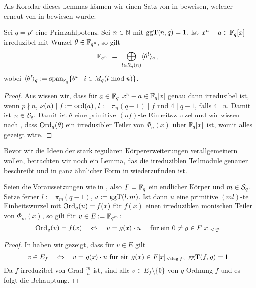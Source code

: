Als Korollar dieses Lemmas können wir einen Satz von \citeauthor{semaev:1989}
\citeyear{semaev:1989} in 
\autocite{semaev:1989} beweisen, welcher erneut von \citeauthor{gao:1997}
\citeyear{gao:1997} in \autocite{gao:1997} bewiesen wurde:

\begin{satz}
  \label{satz:gao1}
  Sei $q = p^r$ eine Primzahlpotenz. Sei $n \in \N$ mit $\ggT(n,q)=1$.
  Ist $x^n - a \in \F_q[x]$ irreduzibel mit Wurzel $\theta\in \F_{q^n}$, so
  gilt 
  \[ \F_{q^n} \speq= \bigoplus_{l\in R_q(n)} \langle \theta^l\rangle_q\,,\]
  wobei $\langle \theta^l\rangle_q := 
  \spann_{\F_q}\{ \theta^i \mid i\in M_q(l\bmod n)\}$.
\end{satz}
\begin{proof}
  Aus \thref{}  wissen wir, dass für $a \in \F_q$
  $x^n-a \in \F_q[x]$ genau dann irreduzibel ist, wenn
  $p\nmid n$, $\nu(n) \mid f := \ord(a)$, $l := \pi_n(q-1)\mid f$ und
  $4 \mid q-1$, falls $4\mid n$. Damit ist $n \in \S_q$.
  Damit ist $\theta$ eine primitive $(nf)$-te Einheitswurzel und wir wissen
  nach , dass
  $\Ord_q(\theta)$ ein irreduzibler Teiler von $\Phi_n(x)$ über $\F_q[x]$ ist,
  womit alles gezeigt wäre.
\end{proof}

Bevor wir die Ideen der stark regulären Körpererweiterungen verallgemeinern
wollen, betrachten wir noch ein Lemma, das die irreduziblen Teilmodule genauer
beschreibt und in ganz ähnlicher Form in \autocite[Theorem
22.5]{hachenberger1997finite} wiederzufinden ist.

\begin{lemma}
  \label{lemma:erzeuger_von_irred_teilmoduln}
  Seien die Voraussetzungen wie in , also
  $F = \F_q$ ein endlicher Körper und $m\in \S_q$. Setze ferner 
  $l := \pi_m(q-1)$, $a := \ggT(l,m)$. Ist dann $u$ eine primitive 
  $(ml)$-te Einheitswurzel mit $\Ord_q(u) = f(x)$ für $f(x)$ einen irreduziblen
  monischen Teiler von $\Phi_m(x)$, so gilt für $v \in E:= \F_{q^m}$:
  \[ \Ord_q(v) = f(x) \quad\Leftrightarrow\quad
    v = g(x) \cdot u\quad\text{ für ein } 0\neq g\in F[x]_{<\frac m a}\]
\end{lemma}
\begin{proof}
  In  haben wir gezeigt, dass für $v \in E$ gilt
  \[ v \in E_f \quad\Leftrightarrow\quad v = g(x)\cdot u 
    \text{ für ein } g(x) \in F[x]_{<\deg f},\ \ggT(f,g) = 1\]
  Da $f$ irreduzibel von Grad $\frac m a$ ist, sind alle $v \in
  E_f\setminus\{0\}$ von $q$-Ordnung $f$ und es folgt die Behauptung.
\end{proof}

